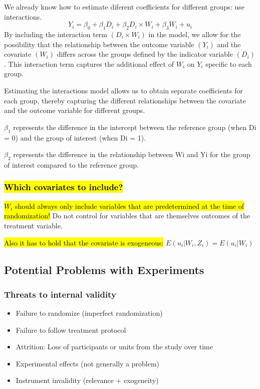 \documentclass[a3paper, 8pt]{extarticle}
\begin{document}
\begin{multicols*}{5}
We already know how to estimate diferent coefficients for different groups: use interactions.
$$Y_i=\beta_0 + \beta_1 D_i + \beta_2 D_i \times W_i + \beta_3 W_i + u_i$$
By including the interaction term $(D_i \times W_i)$ in the model, we allow for the possibility that the relationship between the outcome variable $(Y_i)$ and the covariate $(W_i)$ differs across the groups defined by the indicator variable $(D_i)$. This interaction term captures the additional effect of $W_i$ on $Y_i$ specific to each group.

Estimating the interactions model allows us to obtain separate coefficients for each group, thereby capturing the different relationships between the covariate and the outcome variable for different groups.

$\beta_1$ represents the difference in the intercept between the reference group (when Di = 0) and the group of interest (when Di = 1).

$\beta_2$ represents the difference in the relationship between Wi and Yi for the group of interest compared to the reference group.

\subsubsection{\hl{Which covariates to include?}}
\hl{$W_i$ should always only include variables that are predetermined at the time
of randomization!} Do not control for variables that are themselves outcomes of the treatment variable.

\hl{Also it has to hold that the covariate is exogeneous:} $E(u_i|W_i, Z_i) = E(u_i|W_i)$

\subsection{Potential Problems with Experiments}

\subsubsection{Threats to internal validity}
\begin{itemize}
    \item Failure to randomize (imperfect randomization)
\item Failure to follow treatment protocol
\item Attrition: Loss of participants or units from the study over time
\item Experimental effects (not generally a problem)
\item Instrument invalidity (relevance + exogeneity)
\end{itemize}


\end{multicols*}
\end{document}
